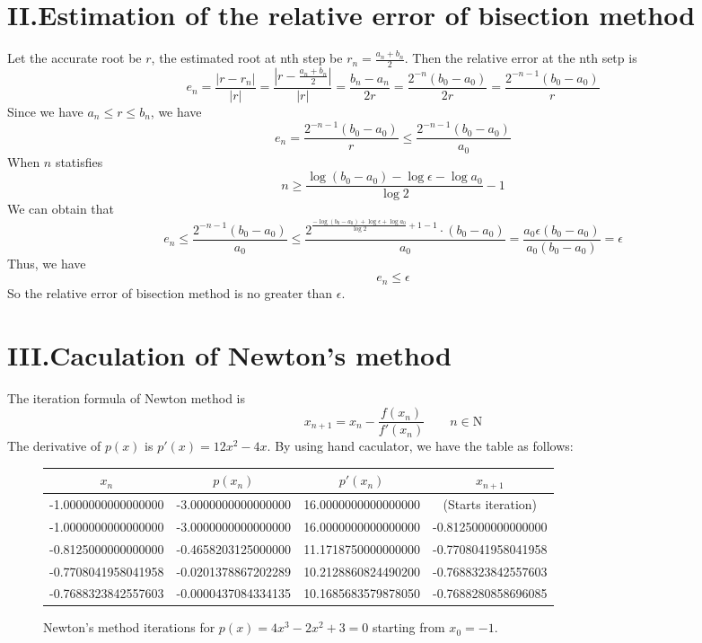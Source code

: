 \documentclass[a4paper]{article}
\begin{document}
\section*{II.Estimation of the relative error of bisection method}

Let the accurate root be $r$, the estimated root at nth step be $r_n = \frac{a_n+b_n}{2}$. Then the relative
error at the nth setp is 
\begin{equation}
    e_n = \frac{|r-r_n|}{|r|} = \frac{|r-\frac{a_n+b_n}{2}|}{|r|} = \frac{b_n-a_n}{2r}=\frac{2^{-n}(b_0-a_0)}{2r}=\frac{2^{-n-1}(b_0-a_0)}{r}
\end{equation}
Since we have $a_n\leq r \leq b_n$, we have
\begin{equation}
  e_n = \frac{2^{-n-1}(b_0-a_0)}{r}\leq \frac{2^{-n-1}(b_0-a_0)}{a_0}  \label{eq:后续引用}
\end{equation}
When $n$ statisfies
\begin{equation}
  n\geq \frac{\log(b_0-a_0)-\log \epsilon-\log a_0}{\log 2}-1
\end{equation}
We can obtain that
\begin{equation}
 e_n\leq \frac{2^{-n-1}(b_0-a_0)}{a_0}\leq \frac{2^{\frac{-\log(b_0-a_0)+\log \epsilon+\log a_0}{\log 2}+1-1}\cdot(b_0-a_0)}{a_0}=\frac{a_0\epsilon(b_0-a_0)}{a_0(b_0-a_0)}=\epsilon
\end{equation}
Thus, we have
\begin{equation}
  e_n\leq \epsilon
\end{equation}
So the relative error of bisection method is no greater than $\epsilon$.
\section*{III.Caculation of Newton's method }
The iteration formula of Newton method is
\begin{equation}
    x_{n+1} = x_n - \frac{f(x_n)}{f'(x_n)} \qquad n\in \mathrm{N}
\end{equation}
The derivative of $p(x)$ is $p'(x)=12x^2-4x$.
By using hand caculator, we have the table as follows:
\begin{figure}[h]
  \centering
  \begin{tabular}{|c|c|c|c|}
  \hline
  $x_n$ & $p(x_n)$ & $p'(x_n)$ & $x_{n+1}$ \\
  \hline
  -1.0000000000000000 & -3.0000000000000000 & 16.0000000000000000 & (Starts iteration) \\
  \hline
  -1.0000000000000000 & -3.0000000000000000 & 16.0000000000000000 & -0.8125000000000000 \\
  \hline
  -0.8125000000000000 & -0.4658203125000000 & 11.1718750000000000 & -0.7708041958041958 \\
  \hline
  -0.7708041958041958 & -0.0201378867202289 & 10.2128860824490200 & -0.7688323842557603 \\
  \hline
  -0.7688323842557603 & -0.0000437084334135 & 10.1685683579878050 & -0.7688280858696085 \\
  \hline
  \end{tabular}
  \caption{Newton's method iterations for $p(x) = 4x^3 - 2x^2 + 3 = 0$ starting from $x_0 = -1$.}
  \label{fig:newton-iterations}
  \end{figure}
\end{document}

